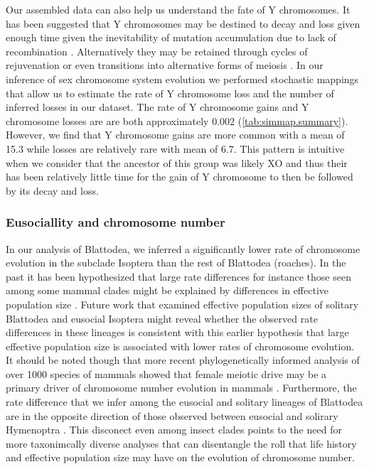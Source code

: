 Our assembled data can also help us understand the fate of Y chromosomes. 
It has been suggested that Y chromosomes may be destined to decay and loss given enough time given the inevitability of mutation accumulation due to lack of recombination \citep{steinemann2005}.
Alternatively they may be retained through cycles of rejuvenation or even transitions into alternative forms of meiosis \citep{blackmon2015bioessay}.
In our inference of sex chromosome system evolution we performed stochastic mappings that allow us to estimate the rate of Y chromosome loss and the number of inferred losses in our dataset.
The rate of Y chromosome gains and Y chromosome losses are are both approximately 0.002 (\cref{tab:simmap.summary}). 
However, we find that Y chromosome gains are more common with a mean of 15.3 while losses are relatively rare with mean of 6.7.
This pattern is intuitive when we consider that the ancestor of this group was likely XO and thus their has been relatively little time for the gain of Y chromosome to then be followed by its decay and loss.

\subsubsection{Eusociallity and chromosome number}

In our analysis of Blattodea, we inferred a significantly lower rate of chromosome evolution in the subclade Isoptera than the rest of Blattodea (roaches).
In the past it has been hypothesized that large rate differences for instance those seen among some mammal clades might be explained by differences in effective population size \citep{bush1977rapid}.
Future work that examined effective population sizes of solitary Blattodea and eusocial Isoptera might reveal whether the observed rate differences in these lineages is consistent with this earlier hypothesis that large effective population size is associated with lower rates of chromosome evolution.
It should be noted though that more recent phylogenetically informed analysis of over 1000 species of mammals showed that female meiotic drive may be a primary driver of chromosome number evolution in mammals \citep{blackmon2019meiotic}.
Furthermore, the rate difference that we infer among the eusocial and solitary lineages of Blattodea are in the opposite direction of those observed between eusocial and solirary Hymenoptra \citep{ross2015}.
This disconect even among insect clades points to the need for more taxonimcally diverse analyses that can disentangle the roll that life history and effective population size may have on the evolution of chromosome number.

